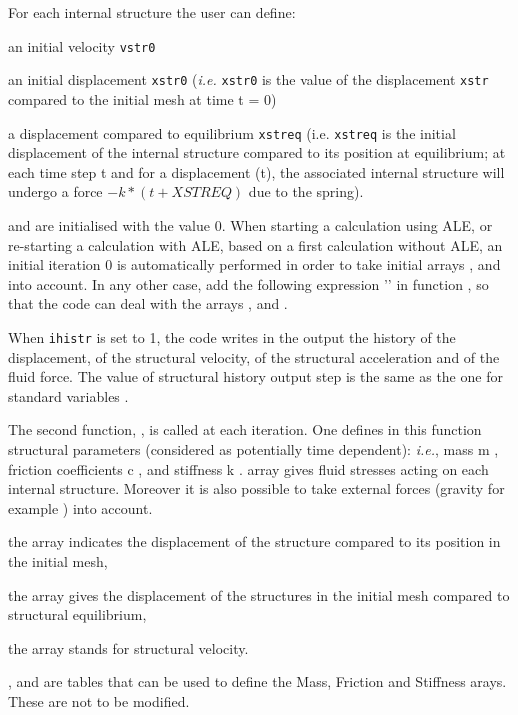 For each internal structure the user can define:
\begin{list}{-}{}
 \item an initial velocity \texttt{vstr0}
 \item an initial displacement \texttt{xstr0} ({\em i.e.} \texttt{xstr0} is the value of the
 displacement \texttt{xstr} compared to the initial mesh at time t = 0)
 \item a displacement compared to equilibrium  \texttt{xstreq} (i.e. \texttt{xstreq}
 is the initial displacement of the internal structure compared to its position at
 equilibrium; at each time step t and for a displacement (t), the associated
 internal structure will undergo a force $-k*(\text{}t+XSTREQ)$ due to the spring).
\end{list}
 and  are initialised with the value 0.
When starting a calculation using ALE, or re-starting a calculation with ALE, based
 on a first calculation without ALE, an initial iteration 0 is automatically performed
 in order to take initial arrays ,  and  into
 account. In any other case, add the following expression '' in function
 , so that the code can deal with the arrays ,  and .

When \texttt{ihistr} is set to 1, the code writes in the output the history of the
 displacement, of the structural velocity, of the structural acceleration and of the
 fluid force. The value of structural history output step is the same as the one for
 standard variables .

The second function, , is called at each iteration. One defines in this
 function structural parameters (considered as potentially time dependent): {\em i.e.},
 mass m , friction coefficients c , and stiffness k .
  array gives fluid stresses acting on each internal structure. Moreover it is also
 possible to take external forces (gravity for example ) into account.
\begin{list}{.}{}
 \item the  array indicates the displacement of the structure compared to its position in the initial mesh,
 \item the  array gives the displacement of the structures in the initial mesh
 compared to structural equilibrium,
 \item the  array stands for structural velocity.
\end{list}
,  and  are  tables that can be used to
 define the  Mass, Friction and Stiffness arays. These are not to be modified.

